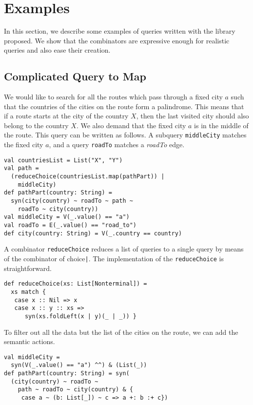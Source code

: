 \section{Examples}
\label{sec:examples}

In this section, we describe some examples of queries written with the library proposed.
We show that the combinators are expressive enough for realistic queries and also ease their creation.

\subsection{Complicated Query to Map}

We would like to search for all the routes which pass through a fixed city $a$ such that the countries of the cities on the route form a palindrome.
This means that if a route starts at the city of the country $X$, then the last visited city should also belong to the country $X$.
We also demand that the fixed city $a$ is in the middle of the route.
This query can be written as follows.
A subquery \lstinline{middleCity} matches the fixed city $a$, and a query \lstinline{roadTo} matches a \emph{roadTo} edge.

\begin{lstlisting}
val countriesList = List("X", "Y")
val path =
  (reduceChoice(countriesList.map(pathPart)) |
    middleCity)
def pathPart(country: String) =
  syn(city(country) ~ roadTo ~ path ~
    roadTo ~ city(country))
val middleCity = V(_.value() == "a")
val roadTo = E(_.value() == "road_to")
def city(country: String) = V(_.country == country)
\end{lstlisting}

A combinator \lstinline{reduceChoice} reduces a list of queries to a single query by means of the combinator of choice\lstinline{|}.
The implementation of the \lstinline{reduceChoice} is straightforward.

\begin{lstlisting}
def reduceChoice(xs: List[Nonterminal]) =
  xs match {
   case x :: Nil => x
   case x :: y :: xs =>
      syn(xs.foldLeft(x | y)(_ | _)) }
\end{lstlisting}

To filter out all the data but the list of the cities on the route, we can add the semantic actions.

\begin{lstlisting}
val middleCity =
  syn(V(_.value() == "a") ^^) & (List(_))
def pathPart(country: String) = syn(
  (city(country) ~ roadTo ~
    path ~ roadTo ~ city(country) & {
     case a ~ (b: List[_]) ~ c => a +: b :+ c})
\end{lstlisting}

